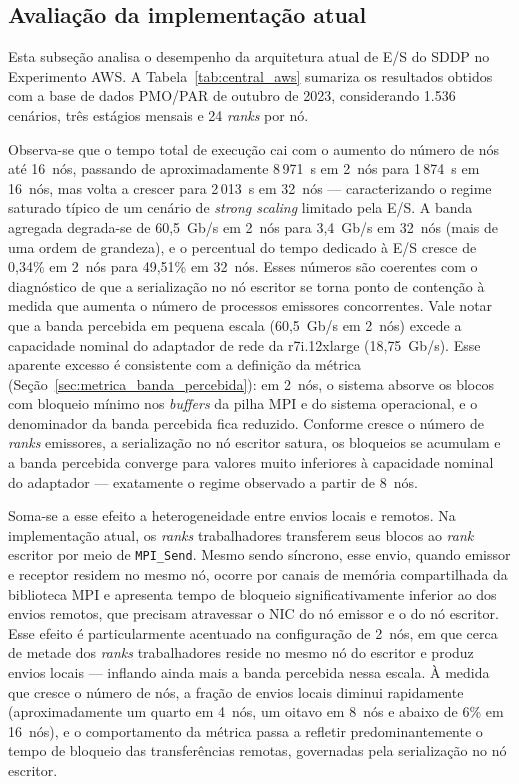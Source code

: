 \subsection{Avaliação da implementação atual}
\label{sec:aws_atual}
Esta subseção analisa o desempenho da arquitetura atual de E/S do SDDP
no Experimento AWS. A Tabela~\ref{tab:central_aws} sumariza os resultados
obtidos com a base de dados PMO/PAR de outubro de 2023, considerando
1.536 cenários, três estágios mensais e 24
\textit{ranks} por nó.

Observa-se que o tempo total de execução cai com o aumento do número de
nós até 16~nós, passando de aproximadamente 8\,971~s em 2~nós para
1\,874~s em 16~nós, mas volta a crescer para 2\,013~s em 32~nós ---
caracterizando o regime saturado típico de um cenário de \textit{strong
scaling} limitado pela E/S. A banda agregada degrada-se de 60{,}5~Gb/s
em 2~nós para 3{,}4~Gb/s em 32~nós (mais de uma ordem de grandeza), e o
percentual do tempo dedicado à E/S cresce de 0{,}34\% em 2~nós para
49{,}51\% em 32~nós. Esses números são coerentes com o
diagnóstico de que a serialização no nó escritor se torna ponto de
contenção à medida que aumenta o número de processos emissores
concorrentes. Vale notar que a banda percebida em pequena escala
(60{,}5~Gb/s em 2~nós) excede a capacidade nominal do adaptador de
rede da r7i.12xlarge (18{,}75~Gb/s). Esse aparente excesso é
consistente com a definição da métrica
(Seção~\ref{sec:metrica_banda_percebida}): em 2~nós, o sistema
absorve os blocos com bloqueio mínimo nos \textit{buffers} da pilha MPI e
do sistema operacional, e o denominador da banda percebida fica
reduzido. Conforme cresce o número de \textit{ranks} emissores, a serialização
no nó escritor satura, os bloqueios se acumulam e a banda percebida
converge para valores muito inferiores à capacidade nominal do
adaptador --- exatamente o regime observado a partir de 8~nós.

Soma-se a esse efeito a heterogeneidade entre envios locais e remotos.
Na implementação atual, os \textit{ranks} trabalhadores transferem
seus blocos ao \textit{rank} escritor por meio de \texttt{MPI\_Send}.
Mesmo sendo síncrono, esse envio, quando emissor e receptor residem
no mesmo nó, ocorre por canais de memória compartilhada da biblioteca
MPI e apresenta tempo de bloqueio significativamente inferior ao dos
envios remotos, que precisam atravessar o NIC do nó emissor e o do
nó escritor. Esse efeito é particularmente acentuado na configuração
de 2~nós, em que cerca de metade dos \textit{ranks} trabalhadores
reside no mesmo nó do escritor e produz envios locais --- inflando
ainda mais a banda percebida nessa escala. À medida que cresce o
número de nós, a fração de envios locais diminui rapidamente
(aproximadamente um quarto em 4~nós, um oitavo em 8~nós e abaixo de
6\% em 16~nós), e o comportamento da métrica passa a refletir
predominantemente o tempo de bloqueio das transferências remotas,
governadas pela serialização no nó escritor.

